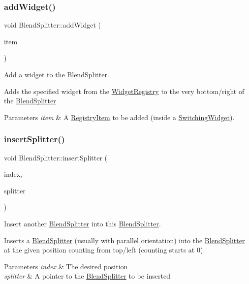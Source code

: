 \subsubsection{\texorpdfstring{add\+Widget()}{addWidget()}\hspace{0.1cm}{\footnotesize\ttfamily [3/3]}}
{\footnotesize\ttfamily void Blend\+Splitter\+::add\+Widget (\begin{DoxyParamCaption}\item[{\hyperlink{class_registry_item}{Registry\+Item} $\ast$}]{item }\end{DoxyParamCaption})}



Add a widget to the \hyperlink{class_blend_splitter}{Blend\+Splitter}. 

Adds the specified widget from the \hyperlink{class_widget_registry}{Widget\+Registry} to the very bottom/right of the \hyperlink{class_blend_splitter}{Blend\+Splitter} 
\begin{DoxyParams}{Parameters}
{\em item} & A \hyperlink{class_registry_item}{Registry\+Item} to be added (inside a \hyperlink{class_switching_widget}{Switching\+Widget}). \\
\hline
\end{DoxyParams}
\hypertarget{class_blend_splitter_a5e1adaac62d47cc3815835e713373e2b}{}\label{class_blend_splitter_a5e1adaac62d47cc3815835e713373e2b} 
\subsubsection{\texorpdfstring{insert\+Splitter()}{insertSplitter()}}
{\footnotesize\ttfamily void Blend\+Splitter\+::insert\+Splitter (\begin{DoxyParamCaption}\item[{int}]{index,  }\item[{\hyperlink{class_blend_splitter}{Blend\+Splitter} $\ast$}]{splitter }\end{DoxyParamCaption})}



Insert another \hyperlink{class_blend_splitter}{Blend\+Splitter} into this \hyperlink{class_blend_splitter}{Blend\+Splitter}. 

Inserts a \hyperlink{class_blend_splitter}{Blend\+Splitter} (usually with parallel orientation) into the \hyperlink{class_blend_splitter}{Blend\+Splitter} at the given position counting from top/left (counting starts at 0). 
\begin{DoxyParams}{Parameters}
{\em index} & The desired position \\
\hline
{\em splitter} & A pointer to the \hyperlink{class_blend_splitter}{Blend\+Splitter} to be inserted \\
\hline
\end{DoxyParams}
\hypertarget{class_blend_splitter_ac26cdfb64fb785a1983a5b7527ce5189}{}\label{class_blend_splitter_ac26cdfb64fb785a1983a5b7527ce5189} 
